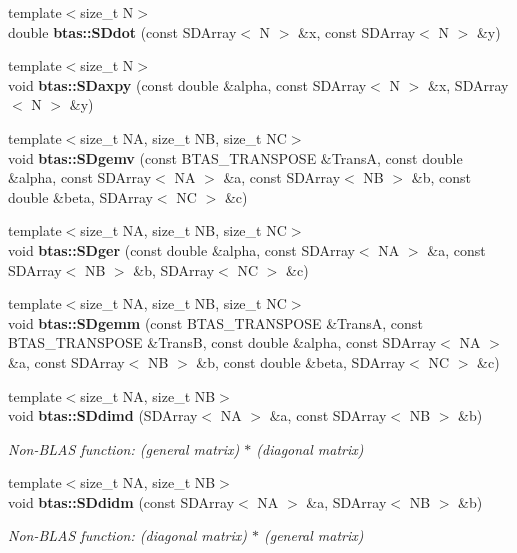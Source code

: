 \begin{DoxyCompactItemize}
\item 
{\footnotesize template$<$size\-\_\-t N$>$ }\\double {\bf btas\-::\-S\-Ddot} (const S\-D\-Array$<$ N $>$ \&x, const S\-D\-Array$<$ N $>$ \&y)
\item 
{\footnotesize template$<$size\-\_\-t N$>$ }\\void {\bf btas\-::\-S\-Daxpy} (const double \&alpha, const S\-D\-Array$<$ N $>$ \&x, S\-D\-Array$<$ N $>$ \&y)
\item 
{\footnotesize template$<$size\-\_\-t N\-A, size\-\_\-t N\-B, size\-\_\-t N\-C$>$ }\\void {\bf btas\-::\-S\-Dgemv} (const B\-T\-A\-S\-\_\-\-T\-R\-A\-N\-S\-P\-O\-S\-E \&Trans\-A, const double \&alpha, const S\-D\-Array$<$ N\-A $>$ \&a, const S\-D\-Array$<$ N\-B $>$ \&b, const double \&beta, S\-D\-Array$<$ N\-C $>$ \&c)
\item 
{\footnotesize template$<$size\-\_\-t N\-A, size\-\_\-t N\-B, size\-\_\-t N\-C$>$ }\\void {\bf btas\-::\-S\-Dger} (const double \&alpha, const S\-D\-Array$<$ N\-A $>$ \&a, const S\-D\-Array$<$ N\-B $>$ \&b, S\-D\-Array$<$ N\-C $>$ \&c)
\item 
{\footnotesize template$<$size\-\_\-t N\-A, size\-\_\-t N\-B, size\-\_\-t N\-C$>$ }\\void {\bf btas\-::\-S\-Dgemm} (const B\-T\-A\-S\-\_\-\-T\-R\-A\-N\-S\-P\-O\-S\-E \&Trans\-A, const B\-T\-A\-S\-\_\-\-T\-R\-A\-N\-S\-P\-O\-S\-E \&Trans\-B, const double \&alpha, const S\-D\-Array$<$ N\-A $>$ \&a, const S\-D\-Array$<$ N\-B $>$ \&b, const double \&beta, S\-D\-Array$<$ N\-C $>$ \&c)
\item 
{\footnotesize template$<$size\-\_\-t N\-A, size\-\_\-t N\-B$>$ }\\void {\bf btas\-::\-S\-Ddimd} (S\-D\-Array$<$ N\-A $>$ \&a, const S\-D\-Array$<$ N\-B $>$ \&b)
\begin{DoxyCompactList}\small\item\em Non-\/\-B\-L\-A\-S function\-: (general matrix) $\ast$ (diagonal matrix) \end{DoxyCompactList}\item 
{\footnotesize template$<$size\-\_\-t N\-A, size\-\_\-t N\-B$>$ }\\void {\bf btas\-::\-S\-Ddidm} (const S\-D\-Array$<$ N\-A $>$ \&a, S\-D\-Array$<$ N\-B $>$ \&b)
\begin{DoxyCompactList}\small\item\em Non-\/\-B\-L\-A\-S function\-: (diagonal matrix) $\ast$ (general matrix) \end{DoxyCompactList}\item 

\end{DoxyCompactItemize}
